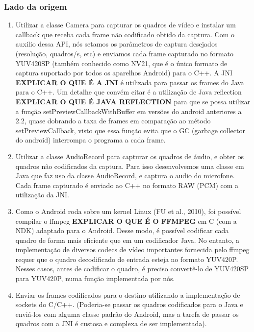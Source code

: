 \documentclass{acm_proc_article-sp}
\newcommand{\todo}[1]{\textcolor[rgb]{1.00,0.00,0.00}{\bf \uppercase{#1}}}
\begin{document}
\subsubsection{Lado da origem}
\begin{enumerate}
 \item Utilizar a classe Camera para capturar os quadros de vídeo e instalar um callback que receba cada frame não codificado obtido da captura. Com o auxilio dessa API, nós setamos os parâmetros de captura desejados (resolução, quadros/s, etc) e enviamos cada frame capturado no formato YUV420SP (também conhecido como NV21, que é o único formato de captura suportado por todos os aparelhos Android) para o C++. A JNI \todo{explicar o que é a JNI} é utilizada para passar os frames do Java para o C++.
Um detalhe que convém citar é a utilização de Java reflection \todo{explicar o que é java reflection} para que se possa utilizar a função setPreviewCallbackWithBuffer em versões do android anteriores a 2.2, quase dobrando a taxa de frames em comparação ao método setPreviewCallback, visto que essa função evita que o GC (garbage collector do android) interrompa o programa a cada frame.
 \item Utilizar a classe AudioRecord para capturar os quadros de áudio, e obter os quadros não codificados da captura. Para isso desenvolvemos uma classe em Java que faz uso da classe AudioRecord, e captura o audio do microfone. Cada frame capturado é enviado ao C++ no formato RAW (PCM) com a utilização da JNI.
 \item Como o Android roda sobre um kernel Linux (FU et al., 2010), foi possível compilar o ffmpeg \todo{explicar o que é o ffmpeg} em C (com a NDK) adaptado para o Android. Desse modo, é possível codificar cada quadro de forma mais eficiente que em um codificador Java. No entanto, a implementação de diversos codecs de vídeo importantes fornecida pelo ffmpeg requer que o quadro decodificado de entrada esteja no formato YUV420P. Nesses casos, antes de codificar o quadro, é preciso convertê-lo de YUV420SP para YUV420P, numa função implementada por nós.
 \item Enviar os frames codificados para o destino utilizando a implementação de sockets do C/C++. (Poderia-se passar os quadros codificados para o Java e enviá-los com alguma classe padrão do Android, mas a tarefa de passar os quadros com a JNI é custosa e complexa de ser implementada).
\end{enumerate}
\end{document}
